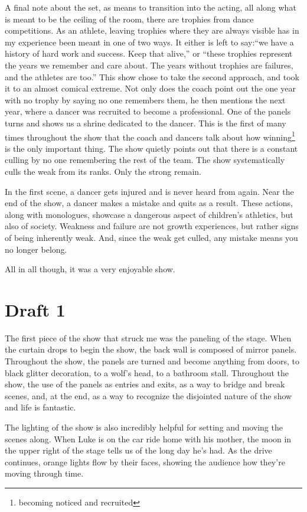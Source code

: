 \documentclass[12pt]{article}[titlepage]
\newcommand{\say}[1]{``#1''}
\newcommand{\1}{\={a}}
\newcommand{\2}{\={e}}
\newcommand{\3}{\={\i}}
\newcommand{\4}{\=o}
\newcommand{\5}{\=u}
\newcommand{\6}{\={A}}
\renewcommand{\,}{\textsuperscript{,}}
\begin{document}
A final note about the set, as means to transition into the acting, all along what is meant to be the ceiling of the room, there are trophies from dance competitions.
As an athlete, leaving trophies where they are always visible has in my experience been meant in one of two ways.
It either is left to say:\say{we have a history of hard work and success. Keep that alive,} or \say{these trophies represent the years we remember and care about. The years without trophies are failures, and the athletes are too.}
This show chose to take the second approach, and took it to an almost comical extreme.
Not only does the coach point out the one year with no trophy by saying no one remembers them, he then mentions the next year, where a dancer was recruited to become a professional.
One of the panels turns and shows us a shrine dedicated to the dancer.
This is the first of many times throughout the show that the coach and dancers talk about how winning\footnote{becoming noticed and recruited} is the only important thing.
The show quietly points out that there is a constant culling by no one remembering the rest of the team.
The show systematically culls the weak from its ranks.
Only the strong remain.

In the first scene, a dancer gets injured and is never heard from again.
Near the end of the show, a dancer makes a mistake and quits as a result. 
These actions, along with monologues, showcase a dangerous aspect of children's athletics, but also of society.
Weakness and failure are not growth experiences, but rather signs of being inherently weak.
And, since the weak get culled, any mistake means you no longer belong.

All in all though, it was a very enjoyable show.
\section{Draft 1}
The first piece of the show that struck me was the paneling of the stage.
When the curtain drops to begin the show, the back wall is composed of mirror panels.
Throughout the show, the panels are turned and become anything from doors, to black glitter decoration, to a wolf's head, to a bathroom stall.
Throughout the show, the use of the panels as entries and exits, as a way to bridge and break scenes, and, at the end, as a way to recognize the disjointed nature of the show and life is fantastic.

The lighting of the show is also incredibly helpful for setting and moving the scenes along.
When Luke is on the car ride home with his mother, the moon in the upper right of the stage tells us of the long day he's had.
As the drive continues, orange lights flow by their faces, showing the audience how they're moving through time.
\end{document}
